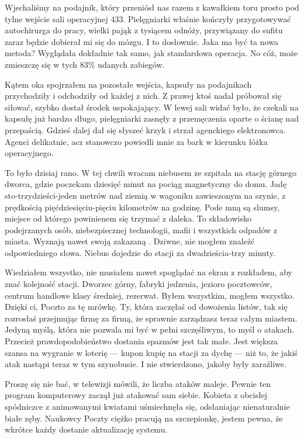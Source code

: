 Wjechaliśmy na podajnik, który przeniósł nas razem z kawałkiem toru prosto pod tylne wejście sali operacyjnej 433.
Pielęgniarki właśnie kończyły przygotowywać autochirurga do pracy, wielki pająk z tysiącem odnóży, przywiązany do sufitu zaraz będzie dobierał mi się do mózgu. I to dosłownie.
Jaka ma być ta nowa metoda? Wyglądała dokładnie tak samo, jak standardowa operacja. No cóż, może zmieszczę się w tych 83\% udanych zabiegów.

Kątem oka spojrzałem na pozostałe wejścia, kapsuły na podajnikach przychodziły i odchodziły od każdej z nich.
Z prawej ktoś nadal próbował się siłować, szybko dostał środek uspokajający.
W lewej sali widać było, że czekali na kapsułę już bardzo długo, pielęgniarki zasnęły z przemęczenia oparte o ścianę nad przepaścią.
Gdzieś dalej dał się słyszeć krzyk i strzał agenckiego elektronowca.
Agenci delikatnie, acz stanowczo powiedli mnie za bark w kierunku łóżka operacyjnego.

\divider{}

To było dzisiaj rano. W tej chwili wracam niebusem ze szpitala na stację górnego dworca, gdzie poczekam dziesięć minut na pociąg magnetyczny do domu.
Jadę sto-trzydzieści-jeden metrów nad ziemią w wagoniku zawieszonym na szynie, z prędkością pięćdziesięciu-pięciu kilometrów na godzinę. 
Pode mną są slumsy, miejsce od którego powinienem się trzymać z daleka. 
To składowisko podejrzanych osób, niebezpiecznej technologii, mafii i wszystkich odpadów z miasta.
Wyznają nawet swoją zakazaną \censor{}.
Dziwne, nie mogłem znaleźć odpowiedniego słowa.
Niebus dojedzie do stacji za dwadzieścia-trzy minuty.

Wiedziałem wszystko, nie musiałem nawet spoglądać na ekran z rozkładem, aby znać kolejność stacji.
Dworzec górny, fabryki jedzenia, jezioro pocztowców, centrum handlowe klasy średniej, rezerwat.
Byłem wszystkim, mogłem wszystko. 
Dzięki ci, Poczto za tę mrówkę. Ty, która zaczęłaś od dowożenia listów, tak się rozrosłaś przejmując firmę za firmą, że sprawnie zarządzasz teraz całym miastem.
Jedyną myślą, która nie pozwala mi być w pełni szczęśliwym, to myśl o atakach. Przecież prawdopodobieństwo dostania spazmów jest tak małe.
Jest większa szansa na wygranie w loterię --- kupon kupię na stacji za dychę --- niż to, że jakiś atak nastąpi teraz w tym szynobusie.
I nie stwierdzono, jakoby były zaraźliwe.

\ds{} Proszę się nie bać, w telewizji mówili, że liczba ataków maleje. 
Pewnie ten program komputerowy zaczął już atakować sam siebie. \dm{} Kobieta z obcisłej spódniczce z animowanymi kwiatami uśmiechnęła się, odsłaniając nienaturalnie białe zęby. \dm{}
Naukowcy Poczty ciężko pracują na szczepionkę, jestem pewna, że wkrótce każdy dostanie aktualizację systemu. \de{}

